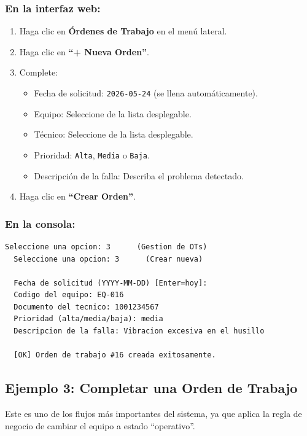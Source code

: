 \documentclass[12pt, a4paper]{article}
\begin{document}
\subsubsection{En la interfaz web:}
\begin{enumerate}[leftmargin=2em]
    \item Haga clic en \textbf{\'Ordenes de Trabajo} en el men\'u lateral.
    \item Haga clic en \textbf{``+ Nueva Orden''}.
    \item Complete:
    \begin{itemize}
        \item Fecha de solicitud: \texttt{2026-05-24} (se llena autom\'aticamente).
        \item Equipo: Seleccione de la lista desplegable.
        \item T\'ecnico: Seleccione de la lista desplegable.
        \item Prioridad: \texttt{Alta}, \texttt{Media} o \texttt{Baja}.
        \item Descripci\'on de la falla: Describa el problema detectado.
    \end{itemize}
    \item Haga clic en \textbf{``Crear Orden''}.
\end{enumerate}

\subsubsection{En la consola:}
\begin{lstlisting}[style=console]
  Seleccione una opcion: 3      (Gestion de OTs)
  Seleccione una opcion: 3      (Crear nueva)

  Fecha de solicitud (YYYY-MM-DD) [Enter=hoy]: 
  Codigo del equipo: EQ-016
  Documento del tecnico: 1001234567
  Prioridad (alta/media/baja): media
  Descripcion de la falla: Vibracion excesiva en el husillo

  [OK] Orden de trabajo #16 creada exitosamente.
\end{lstlisting}

\subsection{Ejemplo 3: Completar una Orden de Trabajo}

Este es uno de los flujos m\'as importantes del sistema, ya que aplica la regla de negocio de cambiar el equipo a estado ``operativo''.
\end{document}
